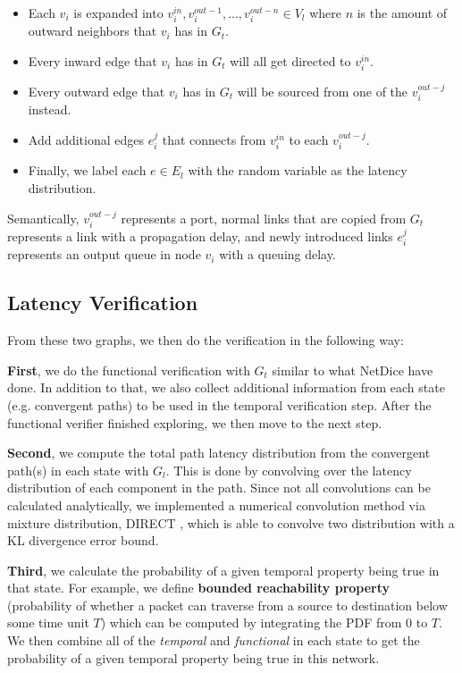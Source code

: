 \documentclass[10pt,sigconf,letterpaper,anonymous,nonacm]{acmart}
\begin{document}
\begin{itemize}
    \item Each $v_i$ is expanded into $v_i^{in}, v_i^{out-1}, ..., v_i^{out-n} \in V_l$ 
    where $n$ is the amount of outward neighbors that $v_i$ has in $G_t$. 

    \item Every inward edge that $v_i$ has in $G_t$ will all get directed to $v_i^{in}$.

    \item Every outward edge that $v_i$ has in $G_t$ will be sourced from one of the 
    $v_i^{out-j}$ instead.
    
    \item Add additional edges $e_i^j$ that connects from $v_i^{in}$ to each $v_i^{out-j}$.

    \item Finally, we label each $e \in E_l$ with the random variable as the latency distribution.
\end{itemize}

Semantically, $v_i^{out-j}$ represents a port, normal links that are copied from $G_t$ represents 
a link with a propagation delay, and newly introduced links $e_i^j$ represents an output queue 
in node $v_i$ with a queuing delay.

\subsection{Latency Verification}
From these two graphs, we then do the verification in the following way:

\textbf{First}, we do the functional verification with $G_t$ similar to what NetDice 
\cite{steffen2020probabilistic} have done. 
In addition to that, we also collect additional information from each state (e.g. convergent 
paths) to be used in the temporal verification step. 
After the functional verifier finished exploring, we then move to the next step.

\textbf{Second}, we compute the total path latency distribution from the convergent path(s) in each 
state with $G_l$.
This is done by convolving over the latency distribution of each component in the path. 
Since not all convolutions can be calculated analytically, we implemented a numerical convolution 
method via mixture distribution, DIRECT \cite{rover2017discrete}, which is able to convolve two 
distribution with a KL divergence error bound.

\textbf{Third}, we calculate the probability of a given temporal property being true in that state. 
For example, we define \textbf{bounded reachability property} (probability of whether a packet can 
traverse from a source to destination below some time unit $T$) which can be computed by 
integrating the PDF from $0$ to $T$. 
We then combine all of the \textit{temporal} and \textit{functional} in each state to get the 
probability of a given temporal property being true in this network.
\end{document}
